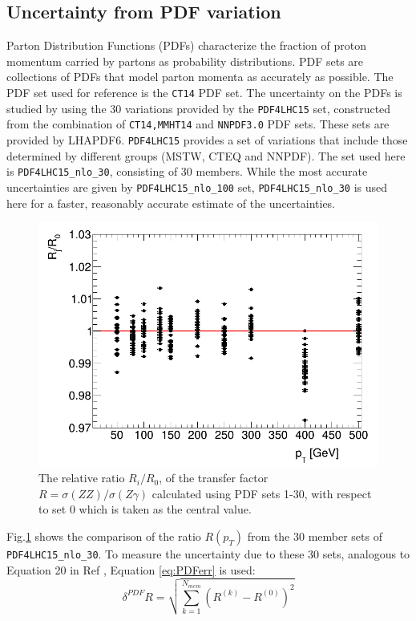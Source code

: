\documentclass[11pt,a4paper]{report}
\begin{document}
\subsection{Uncertainty from PDF variation}
Parton Distribution Functions (PDFs) characterize the fraction of proton momentum carried by partons as probability distributions. PDF sets are collections of PDFs that model parton momenta as accurately as possible. The PDF set used for reference is the \texttt{CT14}\cite{CT14} PDF set. The uncertainty on the PDFs is studied by using the 30 variations provided by the \texttt{PDF4LHC15} set\cite{PDF4}, constructed from the combination of \texttt{CT14,MMHT14}\cite{MMHT14} and \texttt{NNPDF3.0}\cite{NNPDF3} PDF sets. These sets are provided by LHAPDF6\cite{LHAPDF}. \texttt{PDF4LHC15} provides a set of variations that include those determined by different groups (MSTW, CTEQ and NNPDF). The set used here is \texttt{PDF4LHC15\_nlo\_30}, consisting of 30 members. While the most accurate uncertainties are given by \texttt{PDF4LHC15\_nlo\_100} set, \texttt{PDF4LHC15\_nlo\_30} is used here for a faster, reasonably accurate estimate of the uncertainties.
\begin{figure}[H]
\centering
	\includegraphics[width = 0.75\linewidth]{PDF4_30_overlay.png}
	\caption{The relative ratio $R_i/R_0$, of the transfer factor $R = \sigma(ZZ)/\sigma(Z\gamma)$ calculated using PDF sets 1-30, with respect to set 0 which is taken as the central value. }
	\label{fig:PDF30var}
\end{figure}
\noindent Fig.\ref{fig:PDF30var} shows the comparison of the ratio $R(p_T)$ from the 30 member sets of \texttt{PDF4LHC15\_nlo\_30}. To measure the uncertainty due to these 30 sets, analogous to Equation 20 in Ref \cite{PDF4}, Equation \ref{eq:PDFerr} is used:
\begin{equation}\label{eq:PDFerr}
	\delta^{PDF}R = \sqrt{\sum^{N_{mem}}_{k=1} (R^{(k)} - R^{(0)})^2}
\end{equation}
\end{document}
